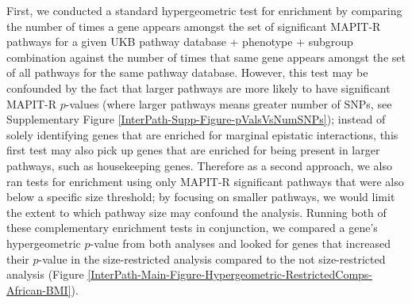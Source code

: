 \documentclass[12pt,a4paper]{article}
\begin{document}
First, we conducted a standard hypergeometric test for enrichment by comparing the number of times a gene appears amongst the set of significant MAPIT-R pathways for a given UKB pathway database + phenotype + subgroup combination against the number of times that same gene appears amongst the set of all pathways for the same pathway database. However, this test may be confounded by the fact that larger pathways are more likely to have significant MAPIT-R $p$-values (where larger pathways means greater number of SNPs, see Supplementary Figure \ref{InterPath-Supp-Figure-pValsVsNumSNPs}); instead of solely identifying genes that are enriched for marginal epistatic interactions, this first test may also pick up genes that are enriched for being present in larger pathways, such as housekeeping genes. Therefore as a second approach, we also ran tests for enrichment using only MAPIT-R significant pathways that were also below a specific size threshold; by focusing on smaller pathways, we would limit the extent to which pathway size may confound the analysis. Running both of these complementary enrichment tests in conjunction, we compared a gene's hypergeometric $p$-value from both analyses and looked for genes that increased their $p$-value in the size-restricted analysis compared to the not size-restricted analysis (Figure \ref{InterPath-Main-Figure-Hypergeometric-RestrictedComps-African-BMI}). 
\end{document}
